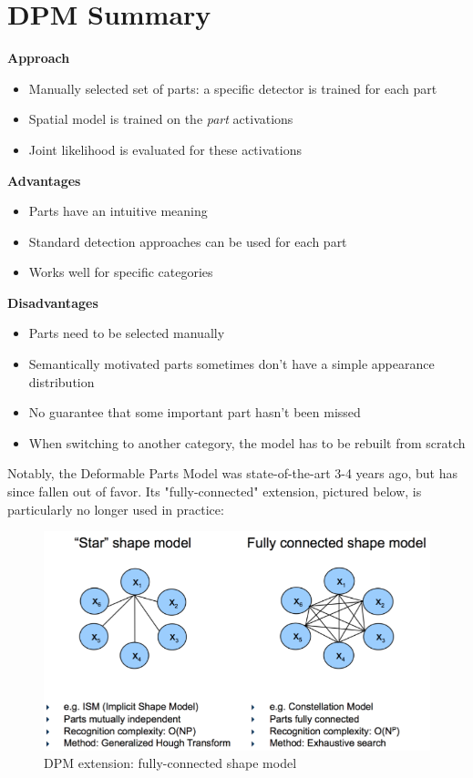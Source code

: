 \documentclass{article}
\begin{document}
\section{DPM Summary}
  \textbf{Approach}
  \begin{itemize}
  \item Manually selected set of parts: a specific detector is trained for each part
  \item Spatial model is trained on the \textit{part} activations
  \item Joint likelihood is evaluated for these activations
  \end{itemize}

  \textbf{Advantages}
  \begin{itemize}
  \item Parts have an intuitive meaning
  \item Standard detection approaches can be used for each part
  \item Works well for specific categories
  \end{itemize}

  \textbf{Disadvantages}
  \begin{itemize}
  \item Parts need to be selected manually
  \item Semantically motivated parts sometimes don’t have a simple appearance distribution 
  \item No guarantee that some important part hasn’t been missed
  \item When switching to another category, the model has to be rebuilt from scratch
  \end{itemize}

  Notably, the Deformable Parts Model was state-of-the-art 3-4 years ago, but has since fallen out of favor. Its "fully-connected" extension, pictured below, is particularly no longer used in practice:

  \begin{figure}[h!]
      \center
      \includegraphics[scale=0.55]{fullyconnected.png}
      \caption{DPM extension: fully-connected shape model}
      \label{fig:fullyconnected}
  \end{figure}

\newpage
\small


\end{document}
